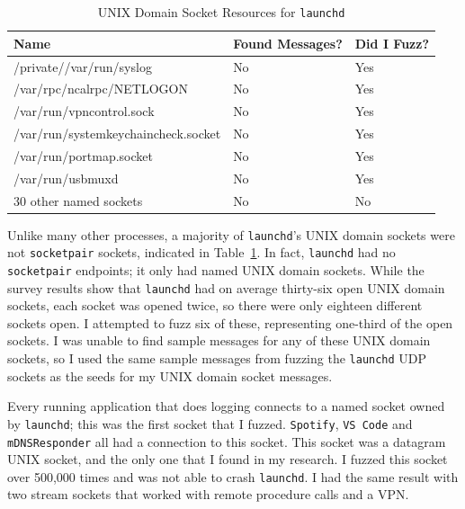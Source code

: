 \begin{table}
\centering
\begin{normalsize}
\begin{tabular}{ l | l | l }
\textbf{Name} & \textbf{Found Messages?} & \textbf{Did I Fuzz?} \\ \hline
/private//var/run/syslog & No & Yes \\ \hline
/var/rpc/ncalrpc/NETLOGON & No & Yes \\ \hline
/var/run/vpncontrol.sock & No & Yes \\ \hline
/var/run/systemkeychaincheck.socket & No & Yes \\ \hline
/var/run/portmap.socket & No & Yes \\ \hline
/var/run/usbmuxd & No & Yes \\ \hline
30 other named sockets & No & No \\ \hline
\end{tabular}
\caption{UNIX Domain Socket Resources for \texttt{launchd}}
\label{tab:launchdUnixTab}
\end{normalsize}
\end{table} 

Unlike many other processes, a majority of \texttt{launchd}'s UNIX domain sockets were not \texttt{socketpair} sockets, indicated in Table~\ref{tab:launchdUnixTab}.  In fact, \texttt{launchd} had no \texttt{socketpair} endpoints; it only had named UNIX domain sockets.  While the survey results show that \texttt{launchd} had on average thirty-six open UNIX domain sockets, each socket was opened twice, so there were only eighteen different sockets open.  I attempted to fuzz six of these, representing one-third of the open sockets.  I was unable to find sample messages for any of these UNIX domain sockets, so I used the same sample messages from fuzzing the \texttt{launchd} UDP sockets as the seeds for my UNIX domain socket messages.

Every running application that does logging connects to a named socket owned by \texttt{launchd}; this was the first socket that I fuzzed.  \texttt{Spotify}, \texttt{VS Code} and \texttt{mDNSResponder} all had a connection to this socket.  This socket was a datagram UNIX socket, and the only one that I found in my research.  I fuzzed this socket over 500,000 times and was not able to crash \texttt{launchd}.  I had the same result with two stream sockets that worked with remote procedure calls and a VPN.

